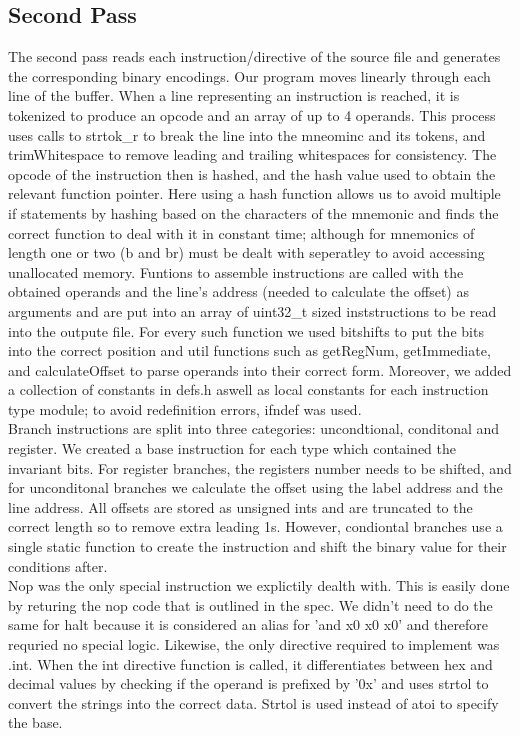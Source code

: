 \documentclass[11pt]{article}
\begin{document}
\subsection{Second Pass}
The second pass reads each instruction/directive of the source file and generates the corresponding binary encodings. Our program moves linearly through each line of the buffer. When a line representing an instruction is reached, it is tokenized to produce an opcode and an array of up to 4 operands. This process uses calls to strtok\_r to break the line into the mneominc and its tokens, and trimWhitespace to remove leading and trailing whitespaces for consistency. The opcode of the instruction then is hashed, and the hash value used to obtain the relevant function pointer. Here using a hash function allows us to avoid multiple if statements by hashing based on the characters of the mnemonic and finds the correct function to deal with it in constant time; although for mnemonics of length one or two (b and br) must be dealt with seperatley to avoid accessing unallocated memory. Funtions to assemble instructions are called with the obtained operands and the line's address (needed to calculate the offset) as arguments and are put into an array of uint32\_t sized inststructions to be read into the outpute file. For every such function we used bitshifts to put the bits into the correct position and util functions such as getRegNum, getImmediate, and calculateOffset to parse operands into their correct form. Moreover, we added a collection of constants in defs.h aswell as local constants for each instruction type module; to avoid redefinition errors, ifndef was used. \\
Branch instructions are split into three categories: uncondtional, conditonal and 	register. We created a base instruction for each type which contained the invariant bits. For register branches, the registers number needs to be shifted, and for unconditonal branches we calculate the offset using the label address and the line address. All offsets are stored as unsigned ints and are truncated to the correct length so to remove extra leading 1s. However, condiontal branches use a single static function to create the instruction and shift the binary value for their conditions after. \\
Nop was the only special instruction we explictily dealth with. This is easily done by returing the nop code that is outlined in the spec. We didn't need to do the same for halt because it is considered an alias for 'and x0 x0 x0' and therefore requried no special logic. Likewise, the only directive required to implement was .int. When the int directive function is called, it differentiates between hex and decimal values by checking if the operand is prefixed by '0x' and uses strtol to convert the strings into the correct data. Strtol is used instead of atoi to specify the base. \\
\end{document}
